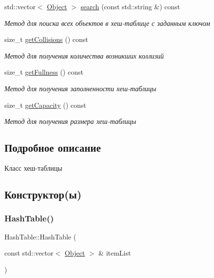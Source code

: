 \begin{DoxyCompactItemize}
std\+::vector$<$ \mbox{\hyperlink{structObject}{Object}} $>$ \mbox{\hyperlink{classHashTable_a9629c6b3cc56102e36d25eb0f10df79f}{search}} (const std\+::string \&) const
\begin{DoxyCompactList}\small\item\em Метод для поиска всех объектов в хеш-\/таблице с заданным ключом \end{DoxyCompactList}\item 
size\+\_\+t \mbox{\hyperlink{classHashTable_a71b8dca2be787ae6f7b0c2f566d5d708}{get\+Collisions}} () const
\begin{DoxyCompactList}\small\item\em Метод для получения количества возникших коллизий \end{DoxyCompactList}\item 
size\+\_\+t \mbox{\hyperlink{classHashTable_af2ad1fc31a7f84454cf695a10cae470f}{get\+Fullness}} () const
\begin{DoxyCompactList}\small\item\em Метод для получения заполненности хеш-\/таблицы \end{DoxyCompactList}\item 
size\+\_\+t \mbox{\hyperlink{classHashTable_a9ccba61a7e386b3843c1a621445d5e92}{get\+Capacity}} () const
\begin{DoxyCompactList}\small\item\em Метод для получения размера хеш-\/таблицы \end{DoxyCompactList}\end{DoxyCompactItemize}


\subsection{Подробное описание}
Класс хеш-\/таблицы 

\subsection{Конструктор(ы)}
\mbox{\label{classHashTable_a76dc30591ccc0f44104f9d42cb342271}} 
\subsubsection{\texorpdfstring{Hash\+Table()}{HashTable()}}
{\footnotesize\ttfamily Hash\+Table\+::\+Hash\+Table (\begin{DoxyParamCaption}\item[{const std\+::vector$<$ \mbox{\hyperlink{structObject}{Object}} $>$ \&}]{item\+List }\end{DoxyParamCaption})}



